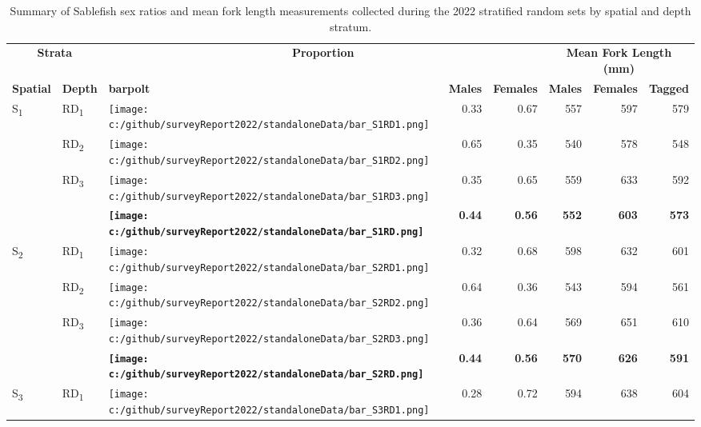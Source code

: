 \documentclass[12pt]{article}\usepackage[]{graphicx}\usepackage[]{color}
\begin{document}
\begin{table}[!h]

\caption{\label{tab:table6}Summary of Sablefish sex ratios and mean fork length measurements collected during the 2022 stratified random sets by spatial and depth stratum.}
\fontsize{9}{11}\selectfont
\begin{tabular}[t]{lllrrrrr}
\toprule
\multicolumn{2}{c}{\textbf{Strata}} & \multicolumn{3}{c}{\textbf{Proportion}} & \multicolumn{3}{c}{\textbf{Mean Fork Length (mm)}} \\
\cmidrule(l{3pt}r{3pt}){1-2} \cmidrule(l{3pt}r{3pt}){3-5} \cmidrule(l{3pt}r{3pt}){6-8}
\textbf{Spatial} & \textbf{Depth} & \textbf{barpolt} & \textbf{Males} & \textbf{Females} & \textbf{Males} & \textbf{Females} & \textbf{Tagged}\\
\midrule
S\textsubscript{1} & RD\textsubscript{1} & \raisebox{.01\height} {\texttt{[image: c:/github/surveyReport2022/standaloneData/bar\_S1RD1.png]}} & 0.33 & 0.67 & 557 & 597 & 579\\
 & RD\textsubscript{2} & \raisebox{.01\height} {\texttt{[image: c:/github/surveyReport2022/standaloneData/bar\_S1RD2.png]}} & 0.65 & 0.35 & 540 & 578 & 548\\
 & RD\textsubscript{3} & \raisebox{.01\height} {\texttt{[image: c:/github/surveyReport2022/standaloneData/bar\_S1RD3.png]}} & 0.35 & 0.65 & 559 & 633 & 592\\
\midrule
\textbf{} & \textbf{} & \textbf{\raisebox{.01\height} {\texttt{[image: c:/github/surveyReport2022/standaloneData/bar\_S1RD.png]}}} & \textbf{0.44} & \textbf{0.56} & \textbf{552} & \textbf{603} & \textbf{573}\\
\midrule
S\textsubscript{2} & RD\textsubscript{1} & \raisebox{.01\height} {\texttt{[image: c:/github/surveyReport2022/standaloneData/bar\_S2RD1.png]}} & 0.32 & 0.68 & 598 & 632 & 601\\
 & RD\textsubscript{2} & \raisebox{.01\height} {\texttt{[image: c:/github/surveyReport2022/standaloneData/bar\_S2RD2.png]}} & 0.64 & 0.36 & 543 & 594 & 561\\
 & RD\textsubscript{3} & \raisebox{.01\height} {\texttt{[image: c:/github/surveyReport2022/standaloneData/bar\_S2RD3.png]}} & 0.36 & 0.64 & 569 & 651 & 610\\
\midrule
\textbf{} & \textbf{} & \textbf{\raisebox{.01\height} {\texttt{[image: c:/github/surveyReport2022/standaloneData/bar\_S2RD.png]}}} & \textbf{0.44} & \textbf{0.56} & \textbf{570} & \textbf{626} & \textbf{591}\\
\midrule
S\textsubscript{3} & RD\textsubscript{1} & \raisebox{.01\height} {\texttt{[image: c:/github/surveyReport2022/standaloneData/bar\_S3RD1.png]}} & 0.28 & 0.72 & 594 & 638 & 604\\

\end{tabular}
\end{table}
\end{document}
